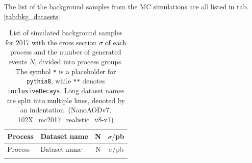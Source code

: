 The list of the background samples from the MC simulations are all listed in tab. \ref{tab:bkg_datasets}.

\begingroup
\footnotesize
\setlength\LTleft{-1.0cm}
\begin{longtable}[b]{llS[table-format=9.0]S[table-format=7.8]}
	\caption{List of simulated background samples for 2017 with the cross section $\sigma$ of each process and the number of generated events $N$, divided into process groups. The symbol \texttt{*} is a placeholder for \texttt{pythia8}, while \texttt{**} denotes \texttt{inclusiveDecays}. Long dataset names are split into multiple lines, denoted by an indentation. (NanoAODv7, 102X\_mc2017\_realistic\_v8-v1)}\\
	Process&Dataset name&{N}&$\sigma/$\si{\pico\barn} \\
	\midrule
	\endfirsthead
	\toprule
	Process&Dataset name&{N}&$\sigma/$\si{\pico\barn} \\
	\midrule
	\endhead
	\bottomrule
	\endfoot
	\bottomrule
	\endlastfoot
	

\end{longtable}
